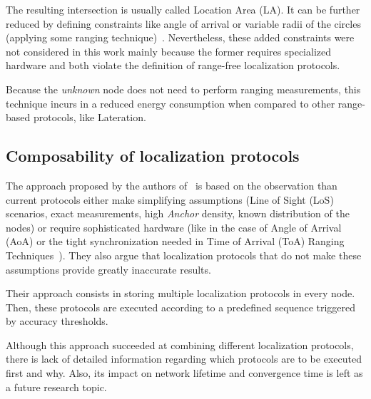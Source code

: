 % 



The resulting intersection is usually called Location Area (LA). It can be further reduced by defining constraints like angle of arrival or variable radii of the circles (applying some ranging technique)~\cite{convexEstimation}. Nevertheless, these added constraints were not considered in this work mainly because the former requires specialized hardware and both violate the definition of range-free localization protocols.

Because the \emph{unknown} node does not need to perform ranging measurements, this technique incurs in a reduced energy consumption when compared to other range-based protocols, like Lateration.

\subsection{Composability of localization protocols}
The approach proposed by the authors of~\cite{composability} is based on the observation than current protocols either make simplifying assumptions (Line of Sight (LoS) scenarios, exact measurements, high \emph{Anchor} density, known distribution of the nodes) or require sophisticated hardware (like in the case of Angle of Arrival (AoA) or the tight synchronization needed in Time of Arrival (ToA) Ranging Techniques~\cite{AkyildizWSNs}). They also argue that localization protocols that do not make these assumptions provide greatly inaccurate results.

Their approach consists in storing multiple localization protocols in every node. Then, these protocols are executed according to a predefined sequence triggered by accuracy thresholds. 

% 

Although this approach succeeded at combining different localization protocols, there is lack of detailed information regarding which protocols are to be executed first and why. Also, its impact on network lifetime and convergence time is left as a future research topic.